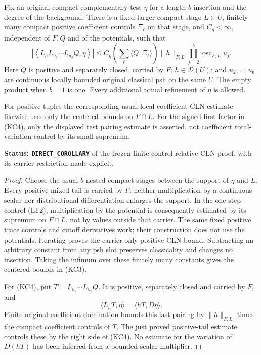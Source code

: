 \begin{lemma}
\label{lem:r12-carrier-only-CLN}
Fix an original compact complementary test \(\eta\) for a
length-\(b\) insertion and the degree of the background.
There is a fixed larger compact stage \(L\Subset U\), finitely
many compact positive coefficient controls \(\Xi_\ell\) on that
stage, and \(C_\eta<\infty\), independent of \(F,Q\) and of the
potentials, such that
\[
 \left|\left\langle L_hL_{u_2}\cdots L_{u_b}Q,\eta\right\rangle\right|
 \le C_\eta\left(\sum_\ell\langle Q,\Xi_\ell\rangle\right)
       \|h\|_{F,L}\prod_{j=2}^b\operatorname{osc}_{F,L}u_j.
 \tag{KC4}
\]
Here \(Q\) is positive and separately closed, carried by \(F\);
\(h\in\mathcal D(U)\); and \(u_2,\ldots,u_b\) are continuous
locally bounded original classical psh on the same \(U\).
The empty product when \(b=1\) is one. Every additional actual
refinement of \(\eta\) is allowed.

For positive tuples the corresponding usual local coefficient
CLN estimate likewise uses only the centered bounds on \(F\cap L\).
For the signed first factor in (KC4), only the displayed test
pairing estimate is asserted, not coefficient total-variation
control by its small supremum.
\end{lemma}

\noindent\textbf{Status: \texttt{DIRECT\_COROLLARY}} of the
frozen finite-control relative CLN proof, with its carrier
restriction made explicit.

\begin{proof}
Choose the usual \(b\) nested compact stages between the support
of \(\eta\) and \(L\). Every positive mixed tail is carried by
\(F\): neither multiplication by a continuous scalar nor
distributional differentiation enlarges the support.
In the one-step control (LT2), multiplication by the potential
is consequently estimated by its supremum on \(F\cap L\), not
by values outside that carrier. The same fixed positive trace
controls and cutoff derivatives work; their construction does
not use the potentials. Iterating proves the carrier-only
positive CLN bound. Subtracting an arbitrary constant from any
psh slot preserves classicality and changes no insertion.
Taking the infimum over these finitely many constants gives the
centered bounds in (KC3).

For (KC4), put \(T=L_{u_2}\cdots L_{u_b}Q\). It is positive,
separately closed and carried by \(F\), and
\[
               \langle L_hT,\eta\rangle=\langle hT,D\eta\rangle.
\]
Finite original coefficient domination bounds this last pairing
by \(\|h\|_{F,L}\) times the compact coefficient controls of \(T\).
The just proved positive-tail estimate controls these by the
right side of (KC4). No estimate for the variation of \(D(hT)\)
has been inferred from a bounded scalar multiplier.
\end{proof}

